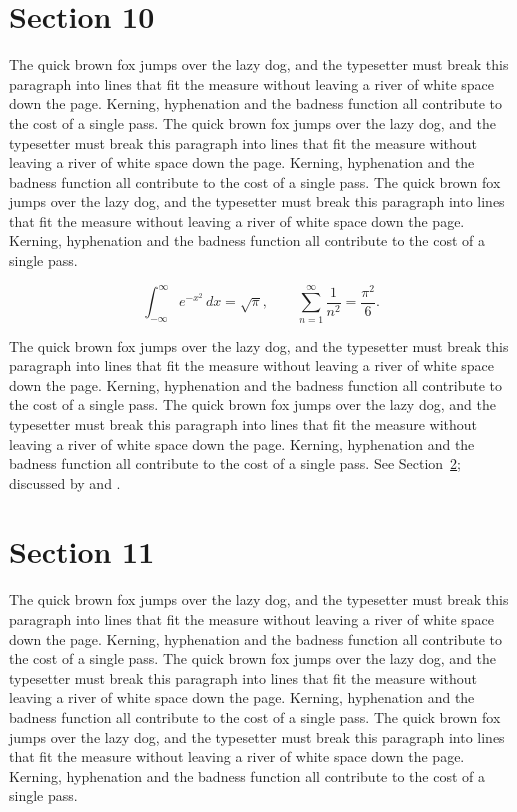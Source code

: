 \documentclass{article}
\begin{document}
\section{Section 10}
\label{sec:10}
The quick brown fox jumps over the lazy dog, and the typesetter must break this paragraph into lines that fit the measure without leaving a river of white space down the page. Kerning, hyphenation and the badness function all contribute to the cost of a single pass. The quick brown fox jumps over the lazy dog, and the typesetter must break this paragraph into lines that fit the measure without leaving a river of white space down the page. Kerning, hyphenation and the badness function all contribute to the cost of a single pass. The quick brown fox jumps over the lazy dog, and the typesetter must break this paragraph into lines that fit the measure without leaving a river of white space down the page. Kerning, hyphenation and the badness function all contribute to the cost of a single pass. 

\begin{equation}\label{eq:10}
\int_{-\infty}^{\infty} e^{-x^{2}}\,dx = \sqrt{\pi}, \qquad
\sum_{n=1}^{\infty} \frac{1}{n^{2}} = \frac{\pi^{2}}{6}.
\end{equation}

The quick brown fox jumps over the lazy dog, and the typesetter must break this paragraph into lines that fit the measure without leaving a river of white space down the page. Kerning, hyphenation and the badness function all contribute to the cost of a single pass. The quick brown fox jumps over the lazy dog, and the typesetter must break this paragraph into lines that fit the measure without leaving a river of white space down the page. Kerning, hyphenation and the badness function all contribute to the cost of a single pass. 
See Section~\ref{sec:11}; discussed by \textcite{k1} and \textcite{l3}.
\section{Section 11}
\label{sec:11}
The quick brown fox jumps over the lazy dog, and the typesetter must break this paragraph into lines that fit the measure without leaving a river of white space down the page. Kerning, hyphenation and the badness function all contribute to the cost of a single pass. The quick brown fox jumps over the lazy dog, and the typesetter must break this paragraph into lines that fit the measure without leaving a river of white space down the page. Kerning, hyphenation and the badness function all contribute to the cost of a single pass. The quick brown fox jumps over the lazy dog, and the typesetter must break this paragraph into lines that fit the measure without leaving a river of white space down the page. Kerning, hyphenation and the badness function all contribute to the cost of a single pass. 
\end{document}

